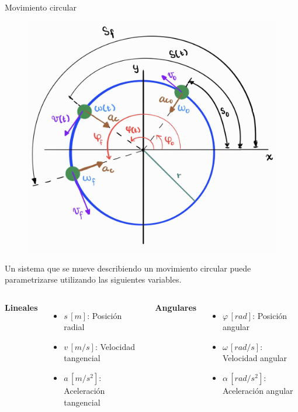 \begin{frame}{Movimiento circular}

    \begin{figure}
        \centering
        \includegraphics[width=0.5\linewidth]{figures/mcua.jpg}
    \end{figure}

    \footnotesize
\vspace{-1em}
    Un sistema que se mueve describiendo un movimiento circular puede parametrizarse utilizando las siguientes variables.
    
    
    \begin{columns}
    \footnotesize
        \textbf{Lineales}
        \begin{itemize}
            \item $s\,[\unit{m}]$: Posición radial
            \item $v\,[\unit{m}/\unit{s}]$: Velocidad tangencial
            \item $a\,[\unit{m}/\unit{s}^2]$: Aceleración tangencial
        \end{itemize}
        \textbf{Angulares}
        \begin{itemize}
            \item $\varphi\,[\unit{rad}]$: Posición angular
            \item $\omega\,[\unit{rad}/\unit{s}]$: Velocidad angular
            \item $\alpha\,[\unit{rad}/\unit{s}^2]$: Aceleración angular
        \end{itemize}
    \end{columns}
    
\end{frame}

